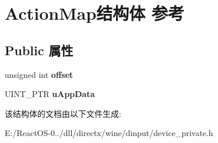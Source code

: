 \hypertarget{struct_action_map}{}\section{Action\+Map结构体 参考}
\label{struct_action_map}
\subsection*{Public 属性}
\begin{DoxyCompactItemize}
\item 
\mbox{\label{struct_action_map_a46ebb96cbe70603862f2033c7016e604}} 
unsigned int {\bfseries offset}
\item 
\mbox{\label{struct_action_map_abcd1353bb615919e1e297f941721c081}} 
U\+I\+N\+T\+\_\+\+P\+TR {\bfseries u\+App\+Data}
\end{DoxyCompactItemize}


该结构体的文档由以下文件生成\+:\begin{DoxyCompactItemize}
\item 
E\+:/\+React\+O\+S-\/0../dll/directx/wine/dinput/device\+\_\+private.\+h\end{DoxyCompactItemize}
